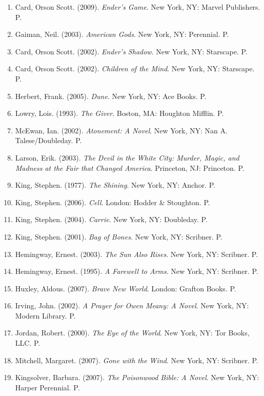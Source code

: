 \documentclass[11pt,a4paper]{article}
\begin{document}
\begin{enumerate}
   \item Card, Orson Scott. (2009). \textit{Ender's Game}. New York, NY: Marvel Publishers. P.
   \item Gaiman, Neil. (2003). \textit{American Gods}. New York, NY: Perennial. P.
   \item Card, Orson Scott. (2002). \textit{Ender's Shadow}. New York, NY: Starscape. P.
   \item Card, Orson Scott. (2002). \textit{Children of the Mind}. New York, NY: Starscape. P.
   \item Herbert, Frank. (2005). \textit{Dune}. New York, NY: Ace Books. P.
   \item Lowry, Lois. (1993). \textit{The Giver}. Boston, MA: Houghton Mifflin. P.
   \item McEwan, Ian. (2002). \textit{Atonement: A Novel}. New York, NY: Nan A. Talese/Doubleday. P.
   \item Larson, Erik. (2003). \textit{The Devil in the White City: Murder, Magic, and Madness at the Fair that Changed America}. Princeton, NJ: Princeton. P.
   \item King, Stephen. (1977). \textit{The Shining}. New York, NY: Anchor. P.
   \item King, Stephen. (2006). \textit{Cell}. London: Hodder \& Stoughton. P.
   \item King, Stephen. (2004). \textit{Carrie}. New York, NY: Doubleday. P.
   \item King, Stephen. (2001). \textit{Bag of Bones}. New York, NY: Scribner. P. 
   \item Hemingway, Ernest. (2003). \textit{The Sun Also Rises}. New York, NY: Scribner. P.
   \item Hemingway, Ernest. (1995). \textit{A Farewell to Arms}. New York, NY: Scribner. P.
   \item Huxley, Aldous. (2007). \textit{Brave New World}. London: Grafton Books. P.
   \item Irving, John. (2002). \textit{A Prayer for Owen Meany: A Novel}. New York, NY: Modern Library. P.
   \item Jordan, Robert. (2000). \textit{The Eye of the World}. New York, NY: Tor Books, LLC. P.
   \item Mitchell, Margaret. (2007). \textit{Gone with the Wind}. New York, NY: Scribner. P.
   \item Kingsolver, Barbara. (2007). \textit{The Poisonwood Bible: A Novel}. New York, NY: Harper Perennial. P.
   
   
\end{enumerate}
\end{document}
